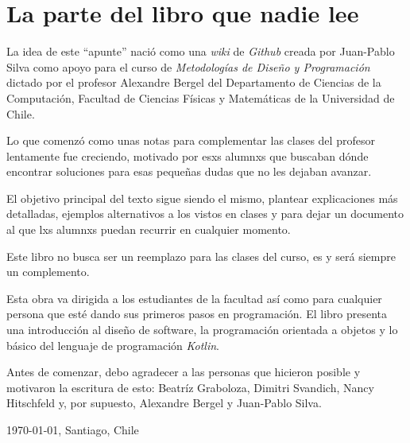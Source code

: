\chapter*{La parte del libro que nadie lee}
  La idea de este \enquote{apunte} nació como una \textit{wiki} de \textit{Github} creada por 
  Juan-Pablo Silva como apoyo para el curso de \textit{Metodologías de Diseño y Programación} 
  dictado por el profesor Alexandre Bergel del Departamento de Ciencias de la Computación, Facultad
  de Ciencias Físicas y Matemáticas de la Universidad de Chile.

  Lo que comenzó como unas notas para complementar las clases del profesor lentamente fue creciendo,
  motivado por esxs alumnxs que buscaban dónde encontrar soluciones para esas pequeñas dudas que no
  les dejaban avanzar.

  El objetivo principal del texto sigue siendo el mismo, plantear explicaciones más detalladas, 
  ejemplos alternativos a los vistos en clases y para dejar un documento al que lxs alumnxs puedan
  recurrir en cualquier momento.

  Este libro no busca ser un reemplazo para las clases del curso, es y será siempre un complemento.

  Esta obra va dirigida a los estudiantes de la facultad así como para cualquier persona que esté
  dando sus primeros pasos en programación.
  El libro presenta una introducción al diseño de software, la programación orientada a objetos y lo
  básico del lenguaje de programación \textit{Kotlin}.

  Antes de comenzar, debo agradecer a las personas que hicieron posible y motivaron la escritura de
  esto: Beatríz Graboloza, Dimitri Svandich, Nancy Hitschfeld y, por supuesto, Alexandre Bergel y 
  Juan-Pablo Silva.

  \begin{center}
    \today, Santiago, Chile
  \end{center}